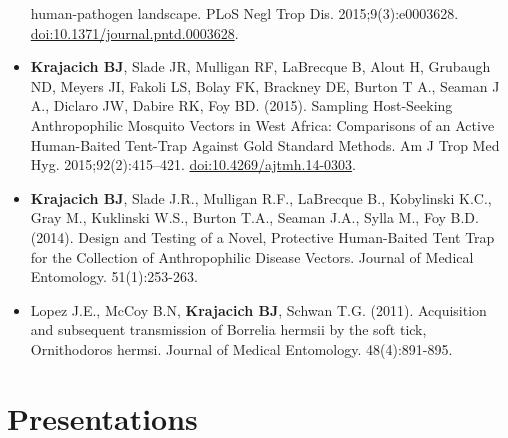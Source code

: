 \documentclass[11pt, a4paper]{awesome-cv}
\begin{document}
\begin{itemize}
  human-pathogen landscape. PLoS Negl Trop Dis. 2015;9(3):e0003628.
  \url{doi:10.1371/journal.pntd.0003628}.
\item
  \textbf{Krajacich BJ}, Slade JR, Mulligan RF, LaBrecque B, Alout H,
  Grubaugh ND, Meyers JI, Fakoli LS, Bolay FK, Brackney DE, Burton T A.,
  Seaman J A., Diclaro JW, Dabire RK, Foy BD. (2015). Sampling
  Host-Seeking Anthropophilic Mosquito Vectors in West Africa:
  Comparisons of an Active Human-Baited Tent-Trap Against Gold Standard
  Methods. Am J Trop Med Hyg. 2015;92(2):415--421.
  \url{doi:10.4269/ajtmh.14-0303}.
\item
  \textbf{Krajacich BJ}, Slade J.R., Mulligan R.F., LaBrecque B.,
  Kobylinski K.C., Gray M., Kuklinski W.S., Burton T.A., Seaman J.A.,
  Sylla M., Foy B.D. (2014). Design and Testing of a Novel, Protective
  Human-Baited Tent Trap for the Collection of Anthropophilic Disease
  Vectors. Journal of Medical Entomology. 51(1):253-263.
\item
  Lopez J.E., McCoy B.N, \textbf{Krajacich BJ}, Schwan T.G. (2011).
  Acquisition and subsequent transmission of Borrelia hermsii by the
  soft tick, Ornithodoros hermsi. Journal of Medical Entomology.
  48(4):891-895.
\end{itemize}

\hypertarget{presentations}{%
\section{Presentations}\label{presentations}}
\end{document}
